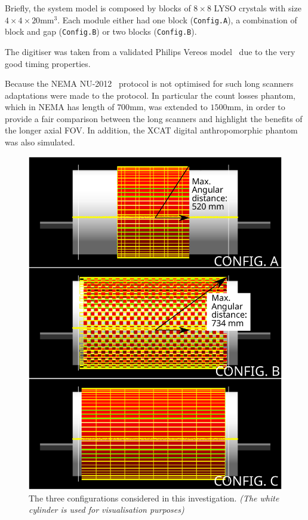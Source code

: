 \documentclass[journal]{IEEEtran}
\begin{document}
Briefly, the system model is composed by blocks of $8 \times 8$ LYSO crystals with size $4 \times 4 \times 20$mm$^3$.  Each module either had one block (\texttt{Config.A}), a combination of block and gap (\texttt{Config.B}) or two blocks (\texttt{Config.B}).

The digitiser was taken from a validated Philips Vereos model~\cite{Rausch2019PerformanceStandard} due to the very good timing properties. 

Because the NEMA NU-2012~\cite{NationalElectricalManufacturersAssociation2012Performance2-2012} protocol is not optimised for such long scanners adaptations were made to the protocol. In particular the count losses phantom, which in NEMA has length of $700$mm, was extended to $1500$mm, in order to provide a fair comparison between the long scanners and highlight the benefits of the longer axial FOV. In addition, the XCAT digital anthropomorphic phantom~\cite{Segars20104DResearch} was also simulated.

\begin{figure}
    \centering
    \includegraphics[width=0.9\linewidth]{dfd.png}
    \caption{The three configurations considered in this investigation. \textit{(The white cylinder is used for visualisation purposes)}}
    \label{fig:configs}
\end{figure}
\end{document}
